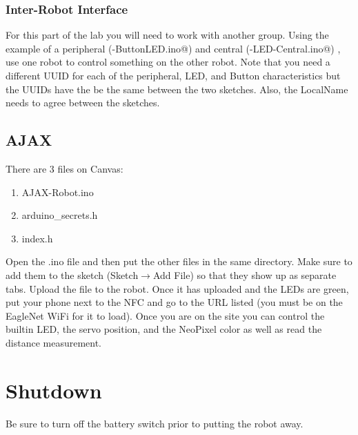 \subsubsection{Inter-Robot Interface}
For this part of the lab you will need to work with another group. Using the example 
of a peripheral (\lstinline@BLE-ButtonLED.ino@) and central (\lstinline@BLE-LED-Central.ino@)
, use one robot to control something on the other robot. Note that you need a different UUID
for each of the peripheral, LED, and Button characteristics but the UUIDs have the be the 
same between the two sketches. Also, the LocalName needs to agree between the sketches.


\subsection{AJAX}
There are 3 files on Canvas:
\begin{enumerate}
    \item AJAX-Robot.ino 
    \item arduino\_secrets.h
    \item index.h 
\end{enumerate}
Open the .ino file and then put the other files in the same directory. Make sure
to add them to the sketch (Sketch$\rightarrow$Add File) so that they show up as separate 
tabs. Upload the file to the robot. Once it has uploaded and the LEDs are green,
put your phone next to the NFC and go to the URL listed (you must be on the 
EagleNet WiFi for it to load). Once you are on the site you can control the 
builtin LED, the servo position, and the NeoPixel color as well as read the 
distance measurement.

\section{Shutdown}
Be sure to turn off the battery switch prior to putting the robot away.


